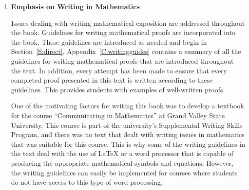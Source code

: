 \begin{enumerate}
\item \textbf{Emphasis on Writing in Mathematics}

Issues dealing with writing mathematical exposition are addressed throughout the book.  Guidelines for writing mathematical proofs are incorporated into the book.  These guidelines are introduced as needed and begin in Section~\ref{S:direct}. Appendix~\ref{C:writingguides}
 contains a summary of all the guidelines for writing mathematical proofs that are introduced throughout the text.  In addition, every attempt has been made to ensure that every completed proof presented in this text is written according to these guidelines.  This provides students with examples of well-written proofs.

One of the motivating factors for writing this book was to develop a textbook for the course ``Communicating in Mathematics''  at Grand Valley State University.  This course is part of the university's Supplemental Writing Skills Program, and there was no text that dealt with writing issues in mathematics that was suitable for this course. This is why some of the writing guidelines in the text deal with the use of \LaTeX 
or a word processor that is capable of producing the appropriate mathematical symbols and equations.  However, the writing guidelines can easily be implemented for courses where students do not have access to this type of word processing.  
%


\end{enumerate}
